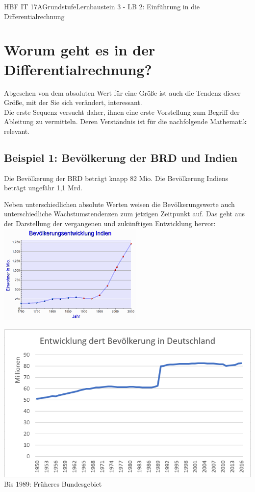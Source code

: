 \documentclass[11pt,twocolumn,oneside,openany,headings=optiontotoc,11pt,numbers=noenddot]{article}
\begin{document}
	\begin{worksheet}{HBF IT 17A}{Grundstufe}{Lernbaustein 3 - LB 2: Einführung in die Differentialrechnung}
		\section{Worum geht es in der Differentialrechnung?}
		Abgesehen von dem absoluten Wert für eine Größe ist auch die Tendenz dieser Größe, mit der Sie sich verändert, interessant.\\
		Die erste Sequenz versucht daher, ihnen eine erste Vorstellung zum Begriff der \glqq{}Ableitung\grqq{} zu vermitteln. Deren Verständnis ist für die nachfolgende Mathematik relevant.
		\subsection*{Beispiel 1: Bevölkerung der BRD und Indien}
		Die Bevölkerung der BRD beträgt knapp 82 Mio. Die Bevölkerung Indiens beträgt ungefähr 1,1 Mrd.\\
		\par
		Neben unterschiedlichen absolute Werten weisen die Bevölkerungswerte auch unterschiedliche Wachstumstendenzen zum jetzigen Zeitpunkt auf. Das geht aus der Darstellung der vergangenen und zukünftigen Entwicklung hervor:\\
		\includegraphics[scale=0.8]{Bilder/BevIndien.png}\\
		\par
		\noindent
		\includegraphics[scale=0.59]{Bilder/BevDeutschland.png}
		\tiny{Bis 1989: Früheres Bundesgebiet}
		\normalsize

\end{worksheet}
\end{document}
